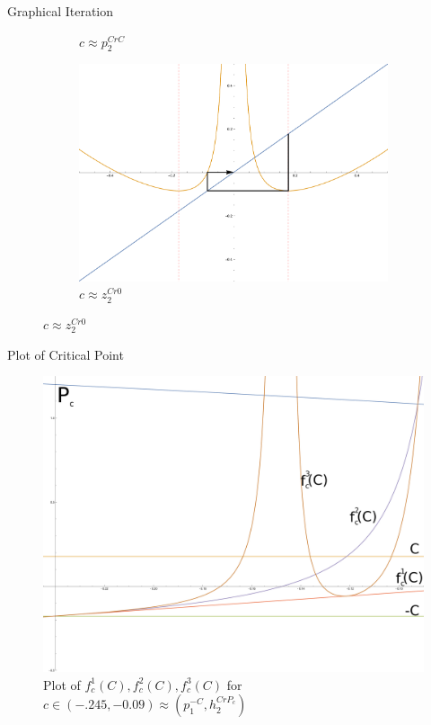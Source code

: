 \documentclass{beamer}
\newcommand{\<}{\left\langle}
\renewcommand{\>}{\right\rangle} %
\renewcommand{\*}{\cdot} %
\newcommand{\pl}{p^{-C}_1}
\newcommand{\pr}{h^{CrP_c}_2}
\begin{document}
\begin{frame}{Graphical Iteration}
\begin{figure}[h]
\begin{subfigure}[b]{0.4\textwidth}
				\caption{$c \approx p_2^{CrC}$}
		\end{subfigure}
		\begin{subfigure}[b]{0.4\textwidth}
			\includegraphics[width=\textwidth]{./img/it2-4}
			\caption{$c \approx z_2^{Cr0}$}
		\end{subfigure}
	\end{figure}
\end{frame}

\begin{frame}{Plot of Critical Point}
	\begin{figure}
		\centering
		\includegraphics[width=.8\textwidth]{./img/3it}
		\caption{\footnotesize Plot of $f^1_c (C),f^2_c (C),f^3_c (C)$ for $c \in (-.245,-0.09) \approx (\pl,\pr)$}
	\end{figure}
\end{frame}
\end{document}
